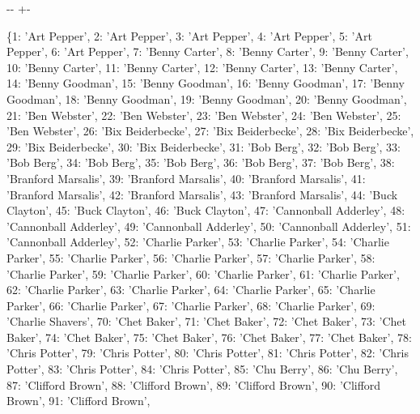 \documentclass[letterpaper,10pt,english]{sphinxmanual}
\newlength\nbsphinxcodecellspacing
\begin{document}
{

\kern-\sphinxverbatimsmallskipamount\kern-\baselineskip
\kern+\FrameHeightAdjust\kern-\fboxrule
\vspace{\nbsphinxcodecellspacing}

\begin{sphinxVerbatim}[commandchars=\\\{\}]
\llap{\color{nbsphinxout}[11]:\,\hspace{\fboxrule}\hspace{\fboxsep}}\{1: 'Art Pepper',
 2: 'Art Pepper',
 3: 'Art Pepper',
 4: 'Art Pepper',
 5: 'Art Pepper',
 6: 'Art Pepper',
 7: 'Benny Carter',
 8: 'Benny Carter',
 9: 'Benny Carter',
 10: 'Benny Carter',
 11: 'Benny Carter',
 12: 'Benny Carter',
 13: 'Benny Carter',
 14: 'Benny Goodman',
 15: 'Benny Goodman',
 16: 'Benny Goodman',
 17: 'Benny Goodman',
 18: 'Benny Goodman',
 19: 'Benny Goodman',
 20: 'Benny Goodman',
 21: 'Ben Webster',
 22: 'Ben Webster',
 23: 'Ben Webster',
 24: 'Ben Webster',
 25: 'Ben Webster',
 26: 'Bix Beiderbecke',
 27: 'Bix Beiderbecke',
 28: 'Bix Beiderbecke',
 29: 'Bix Beiderbecke',
 30: 'Bix Beiderbecke',
 31: 'Bob Berg',
 32: 'Bob Berg',
 33: 'Bob Berg',
 34: 'Bob Berg',
 35: 'Bob Berg',
 36: 'Bob Berg',
 37: 'Bob Berg',
 38: 'Branford Marsalis',
 39: 'Branford Marsalis',
 40: 'Branford Marsalis',
 41: 'Branford Marsalis',
 42: 'Branford Marsalis',
 43: 'Branford Marsalis',
 44: 'Buck Clayton',
 45: 'Buck Clayton',
 46: 'Buck Clayton',
 47: 'Cannonball Adderley',
 48: 'Cannonball Adderley',
 49: 'Cannonball Adderley',
 50: 'Cannonball Adderley',
 51: 'Cannonball Adderley',
 52: 'Charlie Parker',
 53: 'Charlie Parker',
 54: 'Charlie Parker',
 55: 'Charlie Parker',
 56: 'Charlie Parker',
 57: 'Charlie Parker',
 58: 'Charlie Parker',
 59: 'Charlie Parker',
 60: 'Charlie Parker',
 61: 'Charlie Parker',
 62: 'Charlie Parker',
 63: 'Charlie Parker',
 64: 'Charlie Parker',
 65: 'Charlie Parker',
 66: 'Charlie Parker',
 67: 'Charlie Parker',
 68: 'Charlie Parker',
 69: 'Charlie Shavers',
 70: 'Chet Baker',
 71: 'Chet Baker',
 72: 'Chet Baker',
 73: 'Chet Baker',
 74: 'Chet Baker',
 75: 'Chet Baker',
 76: 'Chet Baker',
 77: 'Chet Baker',
 78: 'Chris Potter',
 79: 'Chris Potter',
 80: 'Chris Potter',
 81: 'Chris Potter',
 82: 'Chris Potter',
 83: 'Chris Potter',
 84: 'Chris Potter',
 85: 'Chu Berry',
 86: 'Chu Berry',
 87: 'Clifford Brown',
 88: 'Clifford Brown',
 89: 'Clifford Brown',
 90: 'Clifford Brown',
 91: 'Clifford Brown',

\end{sphinxVerbatim}}
\end{document}
